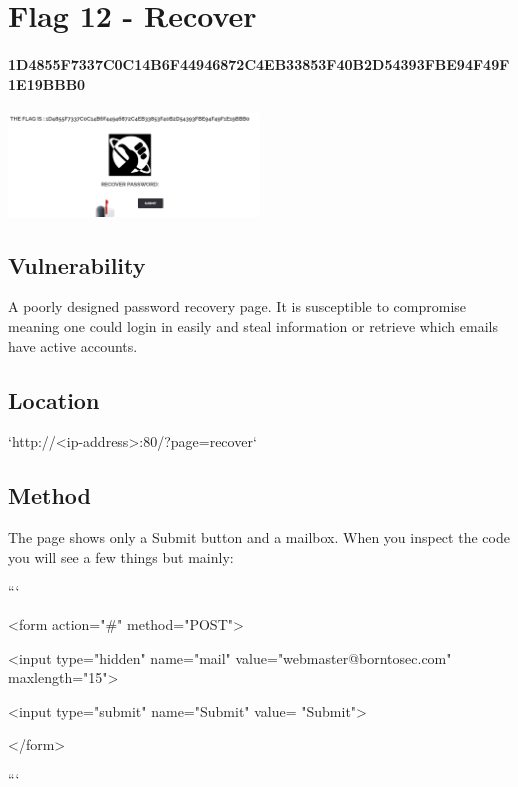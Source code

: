 \section{Flag 12 - Recover}

\paragraph{1D4855F7337C0C14B6F44946872C4EB33853F40B2D54393FBE94F49F1E19BBB0}
\begin{center}
    \includegraphics[width=0.5\textwidth]{15.Flag12/12-07.png}\\[0cm] 
\end{center}

\subsection{Vulnerability}

A poorly designed password recovery page. It is susceptible to compromise meaning one could login in easily and steal information or retrieve which emails have active accounts.

\subsection{Location}

`http://<ip-address>:80/?page=recover`

\subsection{Method}

The page shows only a Submit button and a mailbox. When you inspect the code you will see a few things but mainly:

```

<form action="\#" method="POST">

    <input type="hidden" name="mail" value="webmaster@borntosec.com" maxlength="15">
  
    <input type="submit" name="Submit" value= "Submit">

</form>

```

